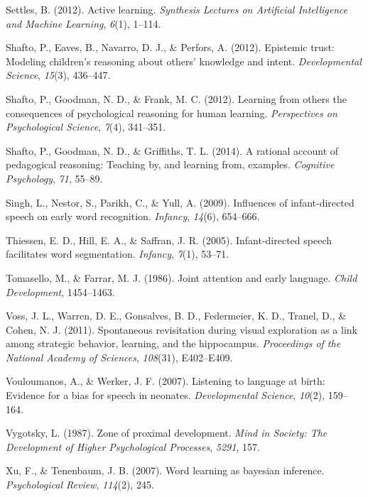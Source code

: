 \documentclass[a4paper,man,apacite,floatsintext]{apa6}
\begin{document}
\hypertarget{ref-settles2012active}{}
Settles, B. (2012). Active learning. \emph{Synthesis Lectures on
Artificial Intelligence and Machine Learning}, \emph{6}(1), 1--114.

\hypertarget{ref-shafto2012epistemic}{}
Shafto, P., Eaves, B., Navarro, D. J., \& Perfors, A. (2012). Epistemic
trust: Modeling children's reasoning about others' knowledge and intent.
\emph{Developmental Science}, \emph{15}(3), 436--447.

\hypertarget{ref-shafto2012learning}{}
Shafto, P., Goodman, N. D., \& Frank, M. C. (2012). Learning from others
the consequences of psychological reasoning for human learning.
\emph{Perspectives on Psychological Science}, \emph{7}(4), 341--351.

\hypertarget{ref-shafto2014rational}{}
Shafto, P., Goodman, N. D., \& Griffiths, T. L. (2014). A rational
account of pedagogical reasoning: Teaching by, and learning from,
examples. \emph{Cognitive Psychology}, \emph{71}, 55--89.

\hypertarget{ref-singh2009influences}{}
Singh, L., Nestor, S., Parikh, C., \& Yull, A. (2009). Influences of
infant-directed speech on early word recognition. \emph{Infancy},
\emph{14}(6), 654--666.

\hypertarget{ref-thiessen2005infant}{}
Thiessen, E. D., Hill, E. A., \& Saffran, J. R. (2005). Infant-directed
speech facilitates word segmentation. \emph{Infancy}, \emph{7}(1),
53--71.

\hypertarget{ref-tomasello1986joint}{}
Tomasello, M., \& Farrar, M. J. (1986). Joint attention and early
language. \emph{Child Development}, 1454--1463.

\hypertarget{ref-voss2011spontaneous}{}
Voss, J. L., Warren, D. E., Gonsalves, B. D., Federmeier, K. D., Tranel,
D., \& Cohen, N. J. (2011). Spontaneous revisitation during visual
exploration as a link among strategic behavior, learning, and the
hippocampus. \emph{Proceedings of the National Academy of Sciences},
\emph{108}(31), E402--E409.

\hypertarget{ref-vouloumanos2007listening}{}
Vouloumanos, A., \& Werker, J. F. (2007). Listening to language at
birth: Evidence for a bias for speech in neonates. \emph{Developmental
Science}, \emph{10}(2), 159--164.

\hypertarget{ref-vygotsky1987zone}{}
Vygotsky, L. (1987). Zone of proximal development. \emph{Mind in
Society: The Development of Higher Psychological Processes},
\emph{5291}, 157.

\hypertarget{ref-xu2007word}{}
Xu, F., \& Tenenbaum, J. B. (2007). Word learning as bayesian inference.
\emph{Psychological Review}, \emph{114}(2), 245.
\end{document}
